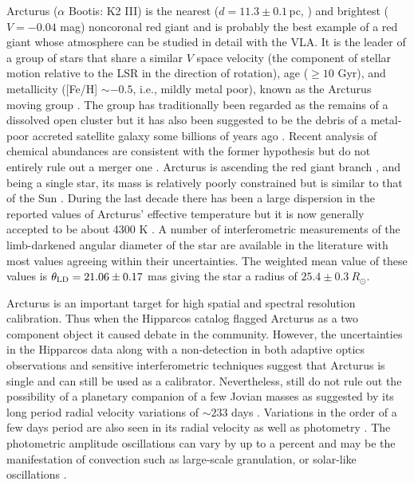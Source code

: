 Arcturus ($\alpha$ Bootis: K2 III) is the nearest ($d=11.3 \pm 0.1$\,pc, \cite{perryman_1997}) and brightest ($V=-0.04$ mag) noncoronal red giant and is probably the best example of a red giant whose atmosphere can be studied in detail with the VLA. It is the leader of a group of stars that share a similar $V$  space velocity (the component of stellar motion relative to the LSR in the direction of rotation),  age ($\geq10$ Gyr), and metallicity ([Fe/H] $\sim -0.5$, i.e., mildly metal poor), known as the Arcturus moving group \citep{eggen_1971}. The group has traditionally been regarded as the remains of a dissolved open cluster \citep[e.g.,][]{eggen_1971,eggen_1996} but it has also been suggested to be  the debris of a metal-poor accreted satellite galaxy some billions of years ago \citep{navarro_2004}. Recent analysis of chemical abundances are consistent with the former hypothesis but do not entirely rule out a merger one \citep{williams_2009}. Arcturus is ascending the red giant branch \citep{abia_2012}, and being a single star, its mass is relatively poorly constrained but is similar to that of the Sun \citep[$0.8 \pm 0.2 \ M_{\odot}$ by][]{kallinger_2010}. During the last decade there has been a large dispersion in the reported values of Arcturus' effective temperature \citep[i.e., $3850 < T_{e} <4630$\,K,][]{griffin_1996} but it is now generally accepted to be about 4300 K \citep{di_benedetto_1993,griffin_1999}. A number of interferometric measurements of the limb-darkened angular diameter of the star are available in the literature with most values agreeing within their uncertainties. The weighted mean value of these values is $\theta _{\rm{LD}}= 21.06\pm0.17$ mas \citep{ramirez_2011} giving the star a radius of $25.4\pm 0.3\ R_{\odot}$.

Arcturus is an important target for high spatial and spectral resolution calibration. Thus when the Hipparcos catalog flagged Arcturus as a two component object \citep{perryman_1997} it caused debate in the community. However, the uncertainties in the  Hipparcos data \citep{Soderhjelm_1998O} along with a non-detection in both adaptive optics observations \citep{turner_1999} and sensitive interferometric techniques \citep{lacour_2008} suggest that Arcturus is single and can still be used as a calibrator. Nevertheless, \cite{lacour_2008} still do not rule out the possibility of a planetary companion of a few Jovian masses as suggested by its long period radial velocity variations of $\sim 233$ days \citep{hatzes_1993,brown_2007}. Variations in the order of a few days period are also seen in its radial velocity \citep{merline_1999} as well as photometry \citep{retter_2003}. The photometric amplitude oscillations can vary by up to a percent and may be the manifestation of convection such as large-scale granulation, or solar-like oscillations \citep{dziembowski_2001}. 

